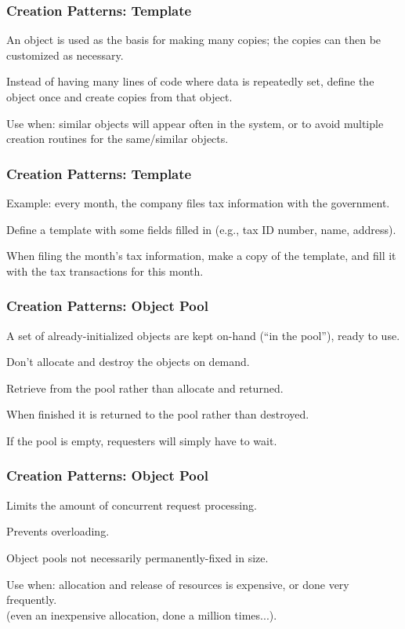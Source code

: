 \begin{frame}
\frametitle{Creation Patterns: Template}
\begin{changemargin}{1cm}

An object is used as the basis for making many copies; the copies can then be customized as necessary.

Instead of having many lines of code where data is repeatedly set, define the object once and create copies from that object.

Use when: similar objects will appear often in the system, or to avoid multiple creation routines for the same/similar objects.

\end{changemargin}
\end{frame}

\begin{frame}
\frametitle{Creation Patterns: Template}
\begin{changemargin}{1cm}

Example: every month, the company files tax information with the government. 

Define a template with some fields filled in (e.g., tax ID number, name, address). 

When filing the month's tax information, make a copy of the template, and fill it with the tax transactions for this month.

\end{changemargin}
\end{frame}

\begin{frame}
\frametitle{Creation Patterns: Object Pool}
\begin{changemargin}{1cm}

A set of already-initialized objects are kept on-hand (``in the pool''), ready to use.

Don't allocate and destroy the objects on demand. 

Retrieve from the pool rather than allocate and returned.

When finished it is returned to the pool rather than destroyed. 

If the pool is empty, requesters will simply have to wait.

\end{changemargin}
\end{frame}


\begin{frame}
\frametitle{Creation Patterns: Object Pool}
\begin{changemargin}{1cm}

Limits the amount of concurrent request processing.

Prevents overloading.

Object pools not necessarily permanently-fixed in size.

Use when: allocation and release of resources is expensive, or done very frequently.\\
\quad (even an inexpensive allocation, done a million times...).

\end{changemargin}
\end{frame}

